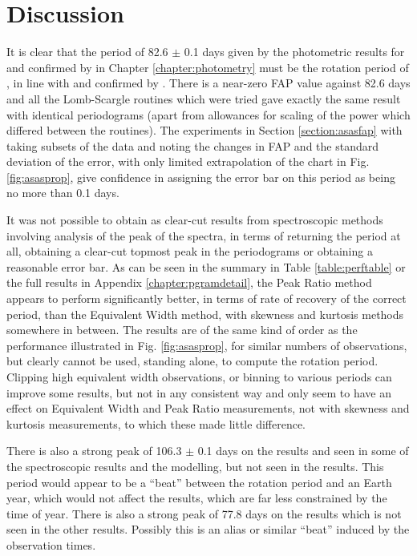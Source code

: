 \chapter{Discussion}
\protect\label{chapter:discussion}

It is clear that the period of 82.6 $\pm$ 0.1 days given by the photometric results for {\asas} and confirmed by {\hst}
in Chapter \ref{chapter:photometry} must be the rotation period of \prox, in line with \citet{benedict98} and confirmed
by \citet{kiraga07}. There is a near-zero FAP value against 82.6 days and all the Lomb-Scargle routines which were tried
gave exactly the same result with identical periodograms (apart from allowances for scaling of the power which differed
between the routines). The experiments in Section \ref{section:asasfap} with taking subsets of the data and noting the
changes in FAP and the standard deviation of the error, with only limited extrapolation of the chart in
Fig. \ref{fig:asasprop}, give confidence in assigning the error bar on this period as being no more than 0.1 days.

It was not possible to obtain as clear-cut results from spectroscopic methods involving analysis of the {\ha} peak of
the {\prox} spectra, in terms of returning the period at all, obtaining a clear-cut topmost peak in the periodograms or
obtaining a reasonable error bar. As can be seen in the summary in Table \ref{table:perftable} or the full results in
Appendix \ref{chapter:pgramdetail}, the Peak Ratio method appears to perform significantly better, in terms of rate of
recovery of the correct period, than the Equivalent Width method, with skewness and kurtosis methods somewhere in
between. The results are of the same kind of order as the performance illustrated in Fig. \ref{fig:asasprop}, for
similar numbers of observations, but clearly cannot be used, standing alone, to compute the rotation period. Clipping high
equivalent width observations, or binning to various periods can improve some results, but not in any consistent way and
only seem to have an effect on Equivalent Width and Peak Ratio measurements, not with skewness and kurtosis
measurements, to which these made little difference.

There is also a strong peak of 106.3 $\pm$ 0.1 days on the {\asas} results and seen in some of the spectroscopic results
and the modelling, but not seen in the {\hst} results. This period would appear to be a ``beat'' between the rotation
period and an Earth year, which would not affect the {\hst} results, which are far less constrained by the time of
year. There is also a strong peak of 77.8 days on the {\hst} results which is not seen in the other results. Possibly
this is an alias or similar ``beat'' induced by the {\hst} observation times.

